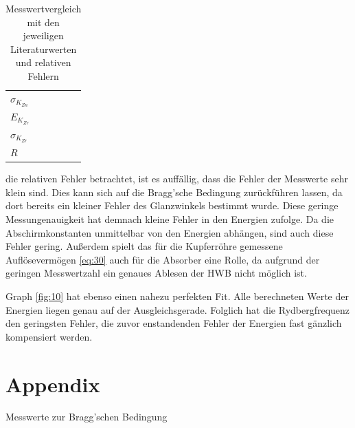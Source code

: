 \begin{table}[H]
\begin{tabular}{l c c r}
            $\sigma_{K_{Zn}}$           &           &                       &  \\
            $E_{K_{Zr}}$                &             &  \cite{NIST}            &  \\
            $\sigma_{K_{Zr}}$           &           &                       &  \\
            $R$                         &             &  \cite{numpy}           &  \\
            \bottomrule
        \end{tabular}
    \caption{Messwertvergleich mit den jeweiligen Literaturwerten und relativen Fehlern}
    \label{tab:6}
    \end{table}

    \justifying die relativen Fehler betrachtet, ist es auffällig, dass die Fehler der Messwerte sehr klein sind. Dies kann sich
    auf die Bragg'sche Bedingung zurückführen lassen, da dort bereits ein kleiner Fehler des Glanzwinkels bestimmt wurde. Diese geringe 
    Messungenauigkeit hat demnach kleine Fehler in den Energien zufolge. Da die Abschirmkonstanten unmittelbar von den Energien abhängen,
    sind auch diese Fehler gering. Außerdem spielt das für die Kupferröhre gemessene Auflösevermögen \eqref{eq:30} auch für die Absorber eine Rolle,
    da aufgrund der geringen Messwertzahl ein genaues Ablesen der HWB nicht möglich ist. 

    \justifying Graph \ref{fig:10} hat ebenso einen nahezu perfekten Fit. Alle berechneten Werte der Energien liegen genau auf der
    Ausgleichsgerade. Folglich hat die Rydbergfrequenz den geringsten Fehler, die zuvor enstandenden Fehler der Energien fast gänzlich kompensiert
    werden.  

\newpage
\printbibliography


\newpage
\section{Appendix}

    

    \begin{table}[H]
        \centering
        \caption{Messwerte zur Bragg'schen Bedingung}
        
        \label{tab:2}
    \end{table}


